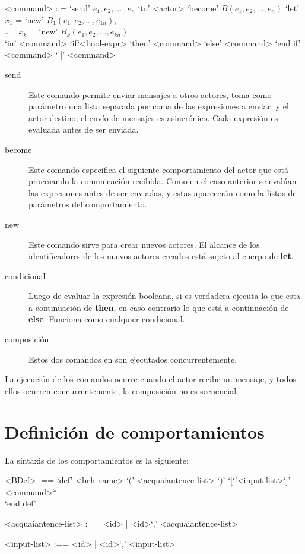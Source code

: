 \begin{grammar}
  <command> ::= `send' $e_1, e_2, \ldots\ , e_n$ `to' <actor>  
  \alt `become' $B(e_1, e_2, ..., e_n)$
  \alt `let' $x_1$ = `new' $B_1(e_1, e_2, ..., e_{1n})$, \\
   \ldots\ \ $x_k$ = `new' $B_k(e_1, e_2, ..., e_{kn})$   \\
  `in' <command> 
  \alt `if`<bool-expr> `then' <command> `else' <command> `end if'
  \alt <command> `||' <command>
\end{grammar}

\begin{description}
\item [send] Este comando permite enviar mensajes a otros actores, toma como
  parámetro una lista separada por coma de las expresiones a enviar, y el actor
  destino, el envío de mensajes es asincrónico. Cada expresión es evaluada antes
  de ser enviada.
\item [become] Este comando especifica el siguiente comportamiento del actor
  que está procesando la comunicación recibida. Como en el caso anterior se evalúan
  las expresiones antes de ser enviadas, y estas aparecerán como la listas de
  parámetros del comportamiento. 
\item[new] Este comando sirve para crear nuevos actores. El alcance de los
  identificadores de los nuevos actores creados está sujeto al cuerpo de \textbf{let}.
\item[condicional] Luego de evaluar la expresión booleana, si es verdadera
  ejecuta lo que esta a continuación de \textbf{then}, en caso contrario lo que está a
  continuación de \textbf{else}. Funciona como cualquier condicional.
\item[composición] Estos dos comandos en \SAL son ejecutados concurrentemente.
 
\end{description}

La ejecución de los comandos ocurre cuando el actor recibe un mensaje, y todos
ellos ocurren concurrentemente, la composición no es secuencial.

\section{Definición de comportamientos}

La sintaxis de los comportamientos es la siguiente:

\begin{grammar}
<BDef> :== `def' <beh name> `(' <acquaiantence-list> `)' `[`'<input-list>`]' \\
\quad \quad <command>*  \\
\quad `end def'
  
<acquaiantence-list> :== <id> | <id>`,' <acquaiantence-list>
  
<input-list> :== <id> | <id>`,' <input-list>
\end{grammar}

